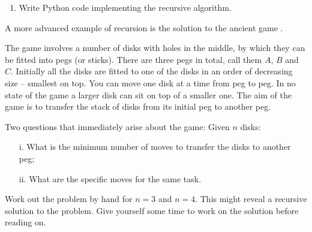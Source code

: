 \documentclass[a4paper]{article}
\begin{document}
{\begin{itemize}
\begin{uexercise}
\begin{enumerate}
\begin{hide}
\begin{usolution}
\begin{ucodeframe}
\end{ucodeframe}

\begin{ucodeframe}
\end{ucodeframe}
\end{usolution}
\end{hide}

\item Write Python code implementing the recursive algorithm.
\begin{hide}
\begin{usolution}
\begin{ucodeframe}
\end{ucodeframe}
\end{usolution}
\end{hide}
\end{enumerate}
\end{uexercise}
\hrulefill

\begin{uexample}
A more advanced example of recursion is the solution to the ancient
game \href{https://en.wikipedia.org/wiki/Tower_of_Hanoi}{}.

The game involves a number of disks with holes in the middle, by which
they can be fitted into pegs (or sticks). There are three pegs in total, call
them $A$, $B$ and $C$. Initially all the disks are fitted to one of the disks in
an order of decreasing size -- smallest on top. You can move one disk at a time
from peg to peg. In no state of the game a larger disk can sit on top of a
smaller one. The aim of the game is to transfer the stack of disks from its
initial peg to another peg.

Two questions that immediately arise about the game: Given $n$ disks:
	\begin{itemize}
	\item[i.] What is the minimum number of moves to transfer the disks to
	another peg;
	\item[ii.] What are the specific moves for the same task. 
	\end{itemize}

Work out the problem by hand for $n=3$ and $n=4$. This might reveal a recursive
solution to the problem. Give yourself some time to work on the solution before
reading on.


\end{uexample}
\end{itemize}}
\end{document}
